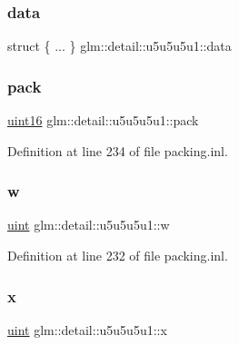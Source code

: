\subsubsection{\texorpdfstring{data}{data}}
{\footnotesize\ttfamily struct \{ ... \}   glm\+::detail\+::u5u5u5u1\+::data}

\mbox{\label{unionglm_1_1detail_1_1u5u5u5u1_acbc99680c58046aeb5c4f2b284680a8b}} 
\subsubsection{\texorpdfstring{pack}{pack}}
{\footnotesize\ttfamily \mbox{\hyperlink{namespaceglm_1_1detail_a47b2a7d006d187338e8031a352d1ce56}{uint16}} glm\+::detail\+::u5u5u5u1\+::pack}



Definition at line 234 of file packing.\+inl.

\mbox{\label{unionglm_1_1detail_1_1u5u5u5u1_a1dc286ba6a4f8b0c04db3997af661cd5}} 
\subsubsection{\texorpdfstring{w}{w}}
{\footnotesize\ttfamily \mbox{\hyperlink{group__core__precision_ga4fd29415871152bfb5abd588334147c8}{uint}} glm\+::detail\+::u5u5u5u1\+::w}



Definition at line 232 of file packing.\+inl.

\mbox{\label{unionglm_1_1detail_1_1u5u5u5u1_a2d802a46e48a88f87754882be376b34f}} 
\subsubsection{\texorpdfstring{x}{x}}
{\footnotesize\ttfamily \mbox{\hyperlink{group__core__precision_ga4fd29415871152bfb5abd588334147c8}{uint}} glm\+::detail\+::u5u5u5u1\+::x}




